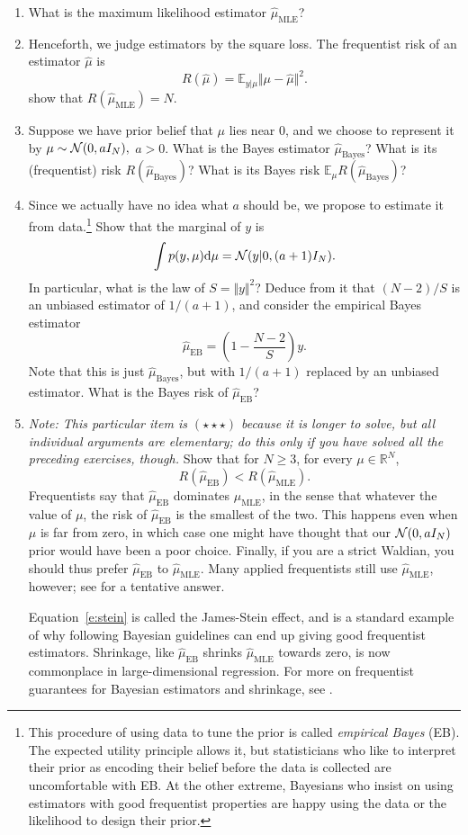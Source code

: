 \documentclass{article}
\begin{document}
\begin{enumerate}
\item What is the maximum likelihood estimator $\hat\mu_{\text{MLE}}$?
\item Henceforth, we judge estimators by the square loss. The frequentist risk of an estimator $\hat\mu$ is
 $$ R(\hat\mu) = \mathbb{E}_{y\vert\mu}  \Vert \mu - \hat\mu\Vert^2.$$
 show that $R(\hat\mu_{\text{MLE}}) = N$.
\item Suppose we have prior belief that $\mu$ lies near $0$, and we choose to represent it by $\mu\sim \mathcal{N}(0,aI_N),$ $a>0$. What is the Bayes estimator $\hat\mu_{\text{Bayes}}$? What is its (frequentist) risk $R(\hat\mu_{\text{Bayes}})$? What is its Bayes risk $\mathbb{E}_\mu R(\hat\mu_{\text{Bayes}})$?
\item Since we actually have no idea what $a$ should be, we propose to estimate it from data.\footnote{This procedure of using data to tune the prior is called \emph{empirical Bayes} (EB). The expected utility principle allows it, but statisticians who like to interpret their prior as encoding their belief before the data is collected are uncomfortable with EB. At the other extreme, Bayesians who insist on using estimators with good frequentist properties are happy using the data or the likelihood to design their prior.} Show that the marginal of $y$ is
$$
\int p(y,\mu){\rm d} \mu = \mathcal{N} (y\vert 0,(a+1)I_N).
$$
In particular, what is the law of $S= \Vert y\Vert^2$? Deduce from it that $(N-2)/S$ is an unbiased estimator of $1/(a+1)$, and consider the empirical Bayes estimator $$\hat\mu_\text{EB} = \left(1- \frac{N-2}{S}\right)y.$$
Note that this is just $\hat\mu_\text{Bayes}$, but with $1/(a+1)$ replaced by an unbiased estimator.
What is the Bayes risk of $\hat\mu_\text{EB}$?
\item \emph{Note: This particular item is $(\star\star\star)$ because it is longer to solve, but all individual arguments are elementary; do this only if you have solved all the preceding exercises, though.} Show that for $N\geq 3$, for every $\mu\in\mathbb{R}^N$,
\begin{equation}
R(\hat\mu_\text{EB}) < R(\hat\mu_\text{MLE}).
\label{e:stein}
\end{equation}
Frequentists say that $\hat\mu_\text{EB}$ dominates $\mu_\text{MLE}$, in the sense that whatever the value of $\mu$, the risk of $\hat\mu_\text{EB}$ is the smallest of the two. This happens even when $\mu$ is far from zero, in which case one might have thought that our $\mathcal{N}(0,aI_N)$ prior would have been a poor choice. Finally, if you are a strict Waldian, you should thus prefer $\hat\mu_\text{EB}$ to $\hat\mu_\text{MLE}$. Many applied frequentists still use $\hat\mu_\text{MLE}$, however; see \citep[Section 1.3]{Efr10} for a tentative answer.

Equation~\ref{e:stein} is called the James-Stein effect, and is a standard example of why following Bayesian guidelines can end up giving good frequentist estimators. Shrinkage, like $\hat\mu_\text{EB}$ shrinks $\hat\mu_\text{MLE}$ towards zero, is now commonplace in large-dimensional regression. For more on frequentist guarantees for Bayesian estimators and shrinkage, see \citep[Sections 7, 8, 9]{PaIn09}.
\end{enumerate}
\end{document}
